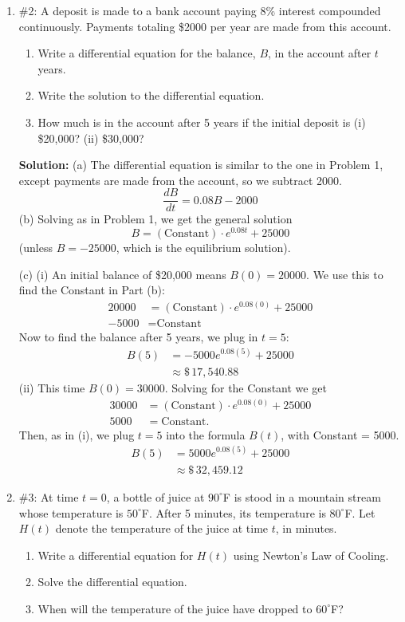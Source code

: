 \documentclass[11pt,letterpaper]{article}
\begin{document}
\begin{enumerate}
\item \#2: A deposit is made to a bank account paying 8\% interest compounded continuously.  Payments totaling \$2000 per year are made from this account.
\begin{enumerate}
\item Write a differential equation for the balance, $B$, in the account after $t$ years.
\item Write the solution to the differential equation.
\item How much is in the account after 5 years if the initial deposit is (i) \$20,000?   (ii) \$30,000?
\end{enumerate}

{\bf Solution:} (a) The differential equation is similar to the one in Problem 1, except payments are made from the account, so we subtract 2000.
\[\frac{dB}{dt}=0.08B-2000\]
(b) Solving as in Problem 1, we get the general solution
\[B=(\text{Constant})\cdot e^{0.08t}+25000\]
(unless $B=-25000$, which is the equilibrium solution).

(c) (i) An initial balance of \$20,000 means $B(0)=20000$.  We use this to find the Constant in Part (b):
\begin{align*}
20000 &=(\text{Constant})\cdot e^{0.08(0)}+25000 \\
-5000 &= \text{Constant}
\end{align*}
Now to find the balance after 5 years, we plug in $t=5$:
\begin{align*}
B(5) &= -5000e^{0.08(5)}+25000 \\
&\approx \$\,17,540.88
\end{align*}
(ii) This time $B(0)=30000$.  Solving for the Constant we get
\begin{align*}
30000 &=(\text{Constant})\cdot e^{0.08(0)}+25000 \\
5000 &= \text{Constant}.
\end{align*}
Then, as in (i), we plug $t=5$ into the formula $B(t)$, with Constant = 5000.
\begin{align*}
B(5) &= 5000e^{0.08(5)}+25000 \\
&\approx \$\,32,459.12
\end{align*}

\item \#3: At time $t=0$, a bottle of juice at $90^{\circ}$F is stood in a mountain stream whose temperature is $50^{\circ}$F.  After 5 minutes, its temperature is $80^{\circ}$F.  Let $H(t)$ denote the temperature of the juice at time $t$, in minutes.
\begin{enumerate}
\item Write a differential equation for $H(t)$ using Newton's Law of Cooling.
\item Solve the differential equation.
\item When will the temperature of the juice have dropped to $60^{\circ}$F?
\end{enumerate}


\end{enumerate}
\end{document}
